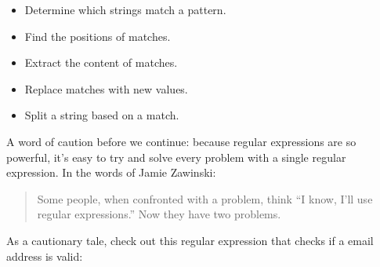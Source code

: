 \documentclass[]{book}
\providecommand{\tightlist}{%
  \setlength{\itemsep}{0pt}\setlength{\parskip}{0pt}}
\begin{document}
\begin{itemize}
\tightlist
\item
  Determine which strings match a pattern.
\item
  Find the positions of matches.
\item
  Extract the content of matches.
\item
  Replace matches with new values.
\item
  Split a string based on a match.
\end{itemize}

A word of caution before we continue: because regular expressions are so
powerful, it's easy to try and solve every problem with a single regular
expression. In the words of Jamie Zawinski:

\begin{quote}
Some people, when confronted with a problem, think ``I know, I'll use
regular expressions.'' Now they have two problems.
\end{quote}

As a cautionary tale, check out this regular expression that checks if a
email address is valid:
\end{document}
